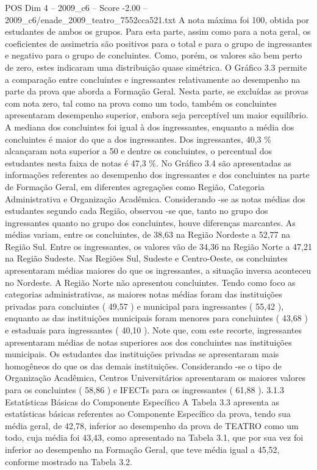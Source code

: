 \begin{textsample}{POS Dim 4 – 2009\_c6 – Score -2.00 – 2009\_c6/enade\_2009\_teatro\_7552cca521.txt}
A nota máxima foi 100, obtida por estudantes de ambos os grupos.
Para esta parte, assim como para a nota geral, os coeficientes de assimetria são positivos para o total e para o grupo de ingressantes e negativo para o grupo de concluintes.
Como, porém, os valores são bem perto de zero, estes indicaram uma distribuição quase simétrica.
O Gráfico 3.3 permite a comparação entre concluintes e ingressantes relativamente ao desempenho na parte da prova que aborda a Formação Geral.
Nesta parte, se excluídas as provas com nota zero, tal como na prova como um todo, também os concluintes apresentaram desempenho superior, embora seja perceptível um maior equilíbrio.
A mediana dos concluintes foi igual à dos ingressantes, enquanto a média dos concluintes é maior do que a dos ingressantes.
Dos ingressantes, 40,3 \% alcançaram nota superior a 50 e dentre os concluintes, o percentual dos estudantes nesta faixa de notas é 47,3 \%.
No Gráfico 3.4 são apresentadas as informações referentes ao desempenho dos ingressantes e dos concluintes na parte de Formação Geral, em diferentes agregações como Região, Categoria Administrativa e Organização Acadêmica.
Considerando -se as notas médias dos estudantes segundo cada Região, observou -se que, tanto no grupo dos ingressantes quanto no grupo dos concluintes, houve diferenças marcantes.
As médias variam, entre os concluintes, de 38,63 na Região Nordeste a 52,77 na Região Sul.
Entre os ingressantes, os valores vão de 34,36 na Região Norte a 47,21 na Região Sudeste.
Nas Regiões Sul, Sudeste e Centro-Oeste, os concluintes apresentaram médias maiores do que os ingressantes, a situação inversa aconteceu no Nordeste.
A Região Norte não apresentou concluintes.
Tendo como foco as categorias administrativas, as maiores notas médias foram das instituições privadas para concluintes ( 49,57 ) e municipal para ingressantes ( 55,42 ), enquanto as das instituições municipais foram menores para concluintes ( 43,68 ) e estaduais para ingressantes ( 40,10 ).
Note que, com este recorte, ingressantes apresentaram médias de notas superiores aos dos concluintes nas instituições municipais.
Os estudantes das instituições privadas se apresentaram mais homogêneos do que os das demais instituições.
Considerando -se o tipo de Organização Acadêmica, Centros Universitários apresentaram os maiores valores para os concluintes ( 58,86 ) e IFECTs para os ingressantes ( 61,88 ). 3.1.3 Estatísticas Básicas do Componente Específico A Tabela 3.3 apresenta as estatísticas básicas referentes ao Componente Específico da prova, tendo sua média geral, de 42,78, inferior ao desempenho da prova de TEATRO como um todo, cuja média foi 43,43, como apresentado na Tabela 3.1, que por sua vez foi inferior ao desempenho na Formação Geral, que teve média igual a 45,52, conforme mostrado na Tabela 3.2.

\end{textsample}
